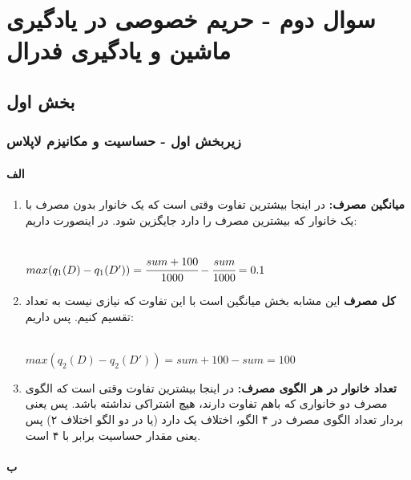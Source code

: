 \def \Subject {سوال دوم - حریم خصوصی در یادگیری ماشین و یادگیری فدرال  }
\def \Session { دو}
\renewcommand{\chaptername}{سوال}
\chapter{\Subject}

\section{بخش اول}

\subsection{ زیربخش اول - حساسیت و مکانیزم لاپلاس}
\subsubsection{الف}
\begin{enumerate}
	\item 
	\textbf{میانگین مصرف:}
	در اینجا بیشترین تفاوت وقتی است که یک خانوار بدون مصرف با یک خانوار که بیشترین مصرف را دارد جایگزین شود. در اینصورت داریم:
	\begin{latin}
		~\\
		$
		max(q_1(D) - q_1(D')) = \cfrac{sum + 100}{1000} - \cfrac{sum}{1000} = 0.1
		$
	\end{latin}
		\item 
	\textbf{کل مصرف}
این مشابه بخش میانگین است با این تفاوت که نیازی نیست به تعداد تقسیم کنیم. پس داریم:
	\begin{latin}
	~\\
	$
	max(q_2(D) - q_2(D')) = sum + 100 - sum  = 100
	$
\end{latin}
\item 
\textbf{تعداد خانوار در هر الگوی مصرف:}
در اینجا بیشترین تفاوت وقتی است که الگوی مصرف دو خانواری که باهم تفاوت دارند، هیچ اشتراکی نداشته باشد. پس یعنی بردار تعداد الگوی مصرف در ۴ الگو، اختلاف یک دارد (یا در دو الگو اختلاف ۲) پس یعنی مقدار حساسیت برابر با ۴ است. 
	
\end{enumerate}
\subsubsection{ب}

